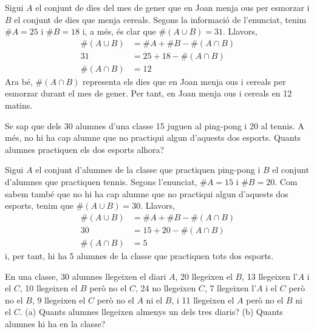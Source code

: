 \begin{solucio}
Sigui $A$ el conjunt de dies del mes de gener que en Joan menja ous per
esmorzar i $B$ el conjunt de dies que menja cereals. Segons la informació
de l'enunciat, tenim $\#A=25$ i $\#B=18$ i, a més, és clar que $%
\#\left( A\cup B\right) =31$. Llavors,
\begin{align*}
\#\left( A\cup B\right) & =\#A+\#B-\#\left( A\cap B\right) \\
31& =25+18-\#\left( A\cap B\right) \\
\#\left( A\cap B\right) & =12
\end{align*}%
Ara bé, $\#\left( A\cap B\right) $ representa els dies que en Joan menja
ous i cereals per esmorzar durant el mes de gener. Per tant, en Joan menja
ous i cereals en 12 matins.
\end{solucio}

\begin{exercici}
Se sap que dels 30 alumnes d'una classe 15 juguen al ping-pong i 20 al
tennis. A més, no hi ha cap alumne que no practiqui algun d'aquests dos
esports. Quants alumnes practiquen els dos esports alhora?
\end{exercici}

\begin{solucio}
Sigui $A$ el conjunt d'alumnes de la classe que practiquen ping-pong i $B$
el conjunt d'alumnes que practiquen tennis. Segons l'enunciat, $\#A=15$ i $
\#B=20$. Com sabem també que no hi ha cap alumne que no practiqui algun
d'aquests dos esports, tenim que $\#\left( A\cup B\right) =30$. Llavors,%
\begin{align*}
\#\left( A\cup B\right) & =\#A+\#B-\#\left( A\cap B\right) \\
30& =15+20-\#\left( A\cap B\right) \\
\#\left( A\cap B\right) & =5
\end{align*}%
i, per tant, hi ha 5 alumnes de la classe que practiquen tots dos esports.
\end{solucio}

\begin{exercici}
En una classe, 30 alumnes llegeixen el diari $A$, 20 llegeixen el $B$, 13
llegeixen l'$A$ i el $C$, 10 llegeixen el $B$ però no el $C$, 24 no
llegeixen $C$, 7 llegeixen l'$A$ i el $C$ però no el $B$, 9 llegeixen el
$C$ però no el $A$ ni el $B$, i 11 llegeixen el $A$ però no el $B$
ni el $C$. (a) Quants alumnes llegeixen almenys un dels tres diaris? (b)
Quants alumnes hi ha en la classe?
\end{exercici}

